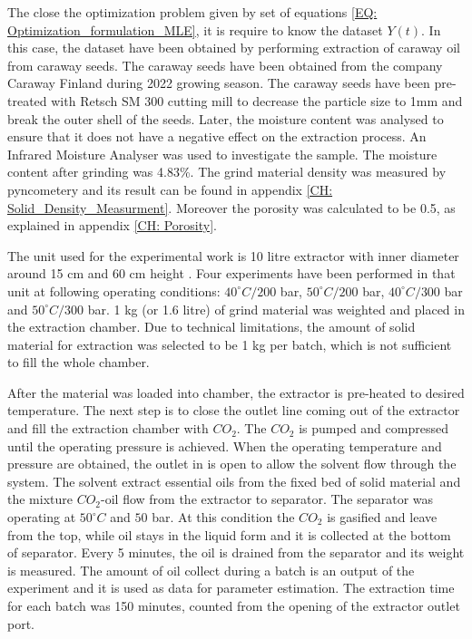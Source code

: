 \documentclass[../Article_Model_Parameters.tex]{subfiles}
\begin{document}
	
	\label{CH: Experiments}
	
	The close the optimization problem given by set of equations \ref{EQ: Optimization_formulation_MLE}, it is require to know the dataset $Y(t)$. In this case, the dataset have been obtained by performing extraction of caraway oil from caraway seeds. The caraway seeds have been obtained from the company Caraway Finland during 2022 growing season. The caraway seeds have been pre-treated with Retsch SM 300 cutting mill to decrease the particle size to 1mm and break the outer shell of the seeds. Later, the moisture content was analysed to ensure that it does not have a negative effect on the extraction process. An Infrared Moisture Analyser was used to investigate the sample. The moisture content after grinding was 4.83\%. The grind material density was measured by pyncometery and its result can be found in appendix \ref{CH: Solid_Density_Measurment}. Moreover the porosity was calculated to be 0.5, as explained in appendix \ref{CH: Porosity}.
	
	The unit used for the experimental work is 10 litre extractor  with inner diameter around 15 cm and 60 cm height . Four experiments have been performed in that unit at following operating conditions: $40^\circ C / 200$ bar, $50^\circ C / 200$ bar, $40^\circ C / 300$ bar and $50^\circ C / 300$ bar. 1 kg (or 1.6 litre) of grind material was weighted and placed in the extraction chamber. Due to technical limitations, the amount of solid material for extraction was selected to be 1 kg per batch, which is not sufficient to fill the whole chamber.
	
	After the material was loaded into chamber, the extractor is pre-heated to desired temperature. The next step is to close the outlet line coming out of the extractor and fill the extraction chamber with $CO_2$. The $CO_2$ is pumped and compressed until the operating pressure is achieved. When the operating temperature and pressure are obtained, the outlet in is open to allow the solvent flow through the system. The solvent extract essential oils from the fixed bed of solid material and the mixture $CO_2$-oil flow from the extractor to separator. The separator was operating at $50^\circ C$ and $50$ bar. At this condition the $CO_2$ is gasified and leave from the top, while oil stays in the liquid form and it is collected at the bottom of separator. Every 5 minutes, the oil is drained from the separator and its weight is measured. The amount of oil collect during a batch is an output of the experiment and it is used as data for parameter estimation. The extraction time for each batch was 150 minutes, counted from the opening of the extractor outlet port.
	
\end{document}

